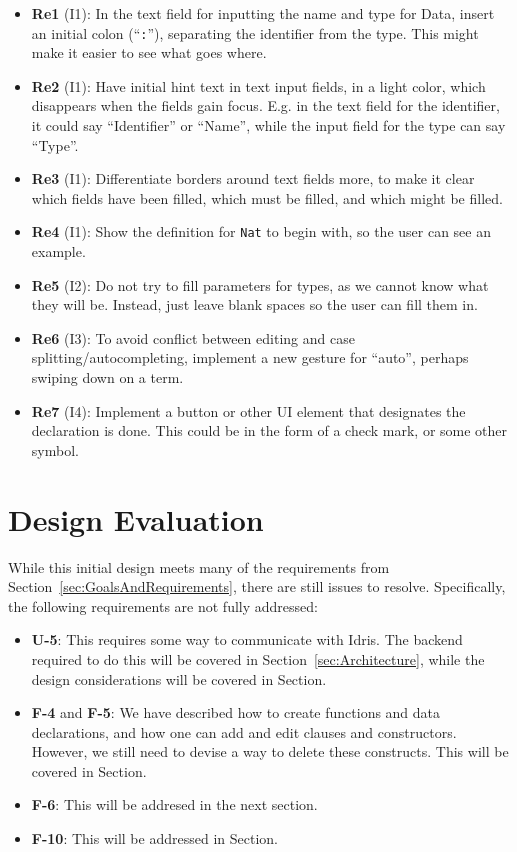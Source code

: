 \begin{itemize}
	\item \textbf{Re1} (I1): In the text field for inputting the name and type for Data, insert an initial colon (``\texttt{:}''), separating the identifier from the type. This might make it easier to see what goes where.
	\item \textbf{Re2} (I1): Have initial hint text in text input fields, in a light color, which disappears when the fields gain focus. E.g. in the text field for the identifier, it could say ``Identifier'' or ``Name'', while the input field for the type can say ``Type''.
	\item \textbf{Re3} (I1): Differentiate borders around text fields more, to make it clear which fields have been filled, which must be filled, and which might be filled.
	\item \textbf{Re4} (I1): Show the definition for \texttt{Nat} to begin with, so the user can see an example.
	\item \textbf{Re5} (I2): Do not try to fill parameters for types, as we cannot know what they will be. Instead, just leave blank spaces so the user can fill them in.
	\item \textbf{Re6} (I3): To avoid conflict between editing and case splitting/autocompleting, implement a new gesture for ``auto'', perhaps swiping down on a term.
	\item \textbf{Re7} (I4): Implement a button or other UI element that designates the declaration is done. This could be in the form of a check mark, or some other symbol.
\end{itemize}


\section{Design Evaluation}
\label{subsec:first_design_evaluation}
While this initial design meets many of the requirements from Section~\ref{sec:GoalsAndRequirements}, there are still issues to resolve.
Specifically, the following requirements are not fully addressed:
\begin{itemize}
	\item \textbf{U-5}: This requires some way to communicate with Idris. The backend required to do this will be covered in Section~\ref{sec:Architecture}, while the design considerations will be covered in Section.
	\item \textbf{F-4} and \textbf{F-5}: We have described how to create functions and data declarations, and how one can add and edit clauses and constructors. However, we still need to devise a way to delete these constructs. This will be covered in Section.
	\item \textbf{F-6}: This will be addresed in the next section.
	\item \textbf{F-10}: This will be addressed in Section.
\end{itemize}

